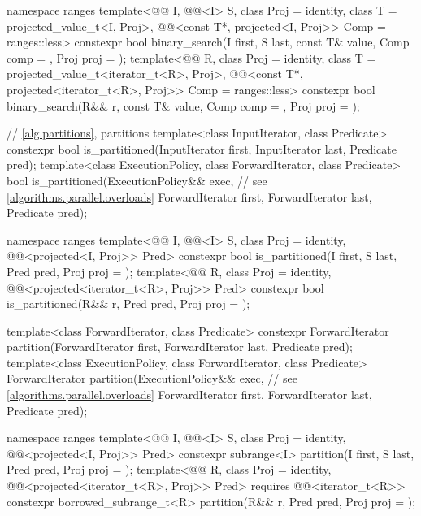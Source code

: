 \begin{codeblock}
{  namespace ranges {
    template<@@ I, @@<I> S, class Proj = identity,
             class T = projected_value_t<I, Proj>,
             @@<const T*, projected<I, Proj>> Comp = ranges::less>
      constexpr bool binary_search(I first, S last, const T& value, Comp comp = {},
                                   Proj proj = {});
    template<@@ R, class Proj = identity,
             class T = projected_value_t<iterator_t<R>, Proj>,
             @@<const T*, projected<iterator_t<R>, Proj>> Comp =
               ranges::less>
      constexpr bool binary_search(R&& r, const T& value, Comp comp = {},
                                   Proj proj = {});
  }

  // \ref{alg.partitions}, partitions
  template<class InputIterator, class Predicate>
    constexpr bool is_partitioned(InputIterator first, InputIterator last, Predicate pred);
  template<class ExecutionPolicy, class ForwardIterator, class Predicate>
    bool is_partitioned(ExecutionPolicy&& exec,                 // see \ref{algorithms.parallel.overloads}
                        ForwardIterator first, ForwardIterator last, Predicate pred);

  namespace ranges {
    template<@@ I, @@<I> S, class Proj = identity,
             @@<projected<I, Proj>> Pred>
      constexpr bool is_partitioned(I first, S last, Pred pred, Proj proj = {});
    template<@@ R, class Proj = identity,
             @@<projected<iterator_t<R>, Proj>> Pred>
      constexpr bool is_partitioned(R&& r, Pred pred, Proj proj = {});
  }

  template<class ForwardIterator, class Predicate>
    constexpr ForwardIterator partition(ForwardIterator first,
                                        ForwardIterator last,
                                        Predicate pred);
  template<class ExecutionPolicy, class ForwardIterator, class Predicate>
    ForwardIterator partition(ExecutionPolicy&& exec,           // see \ref{algorithms.parallel.overloads}
                              ForwardIterator first,
                              ForwardIterator last,
                              Predicate pred);

  namespace ranges {
    template<@@ I, @@<I> S, class Proj = identity,
             @@<projected<I, Proj>> Pred>
      constexpr subrange<I>
        partition(I first, S last, Pred pred, Proj proj = {});
    template<@@ R, class Proj = identity,
             @@<projected<iterator_t<R>, Proj>> Pred>
      requires @@<iterator_t<R>>
      constexpr borrowed_subrange_t<R>
        partition(R&& r, Pred pred, Proj proj = {});
  }

}
\end{codeblock}
